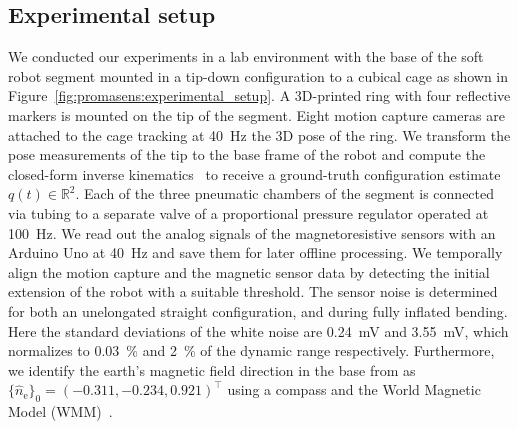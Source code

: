 \subsection{Experimental setup}
We conducted our experiments in a lab environment with the base of the soft robot segment mounted in a tip-down configuration to a cubical cage as shown in Figure~\ref{fig:promasens:experimental_setup}.
A 3D-printed ring with four reflective markers is mounted on the tip of the segment.
Eight motion capture cameras are attached to the cage tracking at \SI{40}{Hz} the 3D pose of the ring.
We transform the pose measurements of the tip to the base frame of the robot and compute the closed-form inverse kinematics~\citep{della2020improved} to receive a ground-truth configuration estimate $q(t) \in \mathbb{R}^2$.
Each of the three pneumatic chambers of the segment is connected via tubing to a separate valve of a proportional pressure regulator operated at \SI{100}{Hz}. %
We read out the analog signals of the magnetoresistive sensors with an Arduino Uno at \SI{40}{Hz} and save them for later offline processing. 
We temporally align the motion capture and the magnetic sensor data by detecting the initial extension of the robot with a suitable threshold.
The sensor noise is determined for both an unelongated straight configuration, and during fully inflated bending. Here the standard deviations of the white noise are \SI{0.24}{mV} and \SI{3.55}{mV}, which normalizes to \SI{0.03}{\percent} and \SI{2}{\percent} of the dynamic range respectively.
Furthermore, we identify the earth's magnetic field direction in the base from as $\{ \hat{n}_{\mathrm{e}} \}_{0} = (-0.311, -0.234, 0.921)^\top$ using a compass and the World Magnetic Model (WMM)~\citep{chulliat2020us}.

